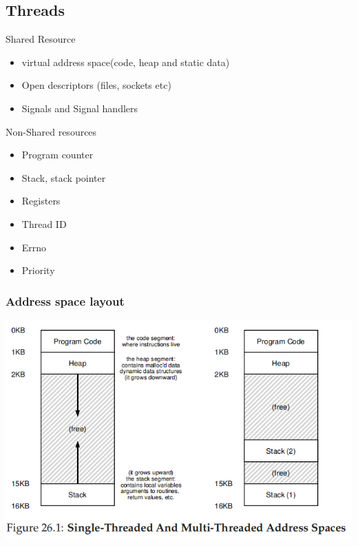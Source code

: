 \documentclass[12pt]{article}
\begin{document}
\subsection{Threads}
Shared Resource
\begin{itemize}
    \item virtual address space(code, heap and static data)
    \item Open descriptors (files, sockets etc)
    \item Signals and Signal handlers
\end{itemize}
Non-Shared resources
\begin{itemize}
    \item Program counter
    \item Stack, stack pointer
    \item Registers
    \item Thread ID 
    \item Errno 
    \item Priority
\end{itemize}
\subsubsection{Address space layout}
\includegraphics[width=\textwidth]{ThreadAddressSpace.png}
\end{document}
